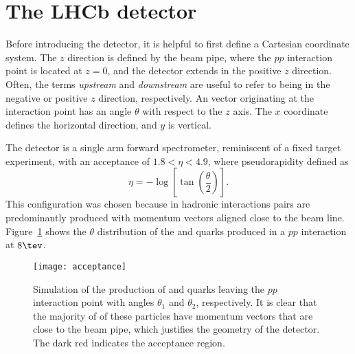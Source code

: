 \section{The LHCb detector}

Before introducing the \lhcb detector, it is helpful to first define a Cartesian coordinate system.
The $z$ direction is defined by the \lhc beam pipe, where the $pp$ interaction point is located
at $z=0$, and the \lhcb detector extends in the positive $z$ direction.
Often, the terms \emph{upstream} and \emph{downstream} are useful to refer to being in the
negative or positive $z$ direction, respectively.
An vector originating at the interaction point has an angle $\theta$ with respect to the $z$ axis.
The $x$ coordinate defines the horizontal direction, and $y$ is vertical.

The \lhcb detector is a single arm forward spectrometer, reminiscent of a fixed target experiment,
with an acceptance of $1.8<\eta<4.9$, where pseudorapidity defined as
\begin{equation}
  \eta = -\log\left[\tan\left(\frac\theta2\right)\right].
\end{equation}
This configuration was chosen because in hadronic interactions \bbbar pairs are predominantly
produced with momentum vectors aligned close to the beam line.
Figure~\ref{fig:lhcb:bbbar} shows the $\theta$ distribution of the \bquark and \bquarkbar quarks
produced in a $pp$ interaction at $8\tev$.

\begin{figure}
  \begin{center}
    \texttt{[image: acceptance]}
  \end{center}
  \caption[Simulated production of $b\bquarkbar$ pairs and the LHCb acceptance]
  {
    Simulation of the production of \bquark and \protect\bquarkbar quarks leaving the $pp$
    interaction point with angles $\theta_1$ and $\theta_2$, respectively.
    It is clear that the majority of of these particles have momentum vectors that are close to the
    beam pipe, which justifies the geometry of the \lhcb detector.
    The dark red indicates the \lhcb acceptance region.
  }
  \label{fig:lhcb:bbbar}
\end{figure}






